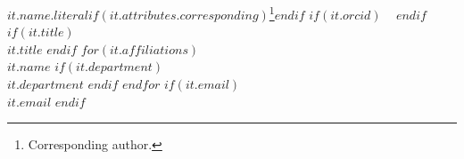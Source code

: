 $it.name.literal$$if(it.attributes.corresponding)$\thanks{Corresponding author.}$endif$
$if(it.orcid)$
~
$endif$
$if(it.title)$
\\$it.title$
$endif$
$for(it.affiliations)$
\\$it.name$
$if(it.department)$
\\$it.department$
$endif$
$endfor$
$if(it.email)$
\\\href{mailto:$it.email$}{$it.email$}
$endif$ 